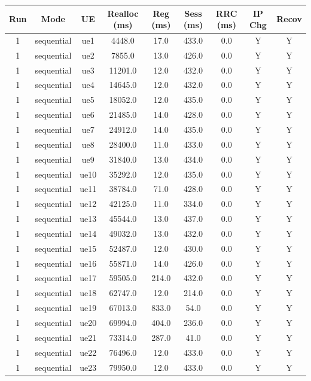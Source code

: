 \begin{table}[ht]
\centering
\begin{tabular}{|c|c|c|c|c|c|c|c|c|}
\hline
Run & Mode & UE & Realloc (ms) & Reg (ms) & Sess (ms) & RRC (ms) & IP Chg & Recov \\
\hline
1 & sequential & ue1 & 4448.0 & 17.0 & 433.0 & 0.0 & Y & Y \\
1 & sequential & ue2 & 7855.0 & 13.0 & 426.0 & 0.0 & Y & Y \\
1 & sequential & ue3 & 11201.0 & 12.0 & 432.0 & 0.0 & Y & Y \\
1 & sequential & ue4 & 14645.0 & 12.0 & 432.0 & 0.0 & Y & Y \\
1 & sequential & ue5 & 18052.0 & 12.0 & 435.0 & 0.0 & Y & Y \\
1 & sequential & ue6 & 21485.0 & 14.0 & 428.0 & 0.0 & Y & Y \\
1 & sequential & ue7 & 24912.0 & 14.0 & 435.0 & 0.0 & Y & Y \\
1 & sequential & ue8 & 28400.0 & 11.0 & 433.0 & 0.0 & Y & Y \\
1 & sequential & ue9 & 31840.0 & 13.0 & 434.0 & 0.0 & Y & Y \\
1 & sequential & ue10 & 35292.0 & 12.0 & 435.0 & 0.0 & Y & Y \\
1 & sequential & ue11 & 38784.0 & 71.0 & 428.0 & 0.0 & Y & Y \\
1 & sequential & ue12 & 42125.0 & 11.0 & 334.0 & 0.0 & Y & Y \\
1 & sequential & ue13 & 45544.0 & 13.0 & 437.0 & 0.0 & Y & Y \\
1 & sequential & ue14 & 49032.0 & 13.0 & 432.0 & 0.0 & Y & Y \\
1 & sequential & ue15 & 52487.0 & 12.0 & 430.0 & 0.0 & Y & Y \\
1 & sequential & ue16 & 55871.0 & 14.0 & 426.0 & 0.0 & Y & Y \\
1 & sequential & ue17 & 59505.0 & 214.0 & 432.0 & 0.0 & Y & Y \\
1 & sequential & ue18 & 62747.0 & 12.0 & 214.0 & 0.0 & Y & Y \\
1 & sequential & ue19 & 67013.0 & 833.0 & 54.0 & 0.0 & Y & Y \\
1 & sequential & ue20 & 69994.0 & 404.0 & 236.0 & 0.0 & Y & Y \\
1 & sequential & ue21 & 73314.0 & 287.0 & 41.0 & 0.0 & Y & Y \\
1 & sequential & ue22 & 76496.0 & 12.0 & 433.0 & 0.0 & Y & Y \\
1 & sequential & ue23 & 79950.0 & 12.0 & 433.0 & 0.0 & Y & Y \\

\end{tabular}
\end{table}
